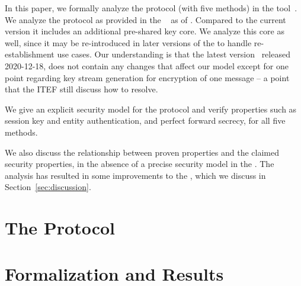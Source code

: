 \documentclass[runningheads, envcountsame, hidelinks, a4paper, draft, x11names]{llncs}
\begin{document}
In this paper, we formally analyze the \mEdhoc{} protocol (with five methods)
in the \mTamarin{} tool~\cite{DBLP:conf/cav/MeierSCB13}.
%
We analyze the protocol as provided in the
\mSpec{}~\cite{our-analysis-selander-lake-edhoc-01} as of \mDate.
%
Compared to the current version it includes an additional pre-shared key core.
%
We analyze this core as well, since it may be re-introduced in later versions
of the \mSpec{} to handle re-establishment use cases.
%
Our understanding is that the latest version~\cite{latest-ietf-lake-edhoc-03}
released 2020-12-18, does not contain any changes that affect our model except
for one point regarding key stream generation for encryption of one message --
a point that the ITEF still discuss how to resolve.
%

%
%
We give an explicit security model for the protocol and verify
properties such as session key and entity authentication, and perfect forward
secrecy, for all five methods.

%
We also discuss the relationship between proven properties and the claimed
security properties, in the absence of a precise security model in the \mSpec.
%
The analysis has resulted in some improvements to the \mSpec,
which we discuss in Section~\ref{sec:discussion}.
%

\section{The \mEdhoc{} Protocol}
\label{sec:edhoc}


\section{Formalization and Results}
\label{sec:formalization}


\end{document}
